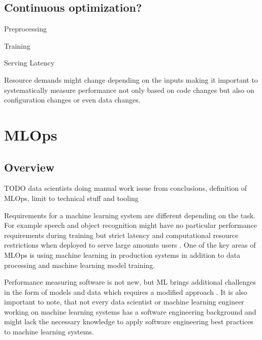 \subsection{Continuous optimization?}

Preprocessing

Training

Serving Latency

Resource demands might change depending on the inputs \parencite{brunnertPerformanceorientedDevOpsResearch2015} making it important to systematically measure performance not only based on code changes but also on configuration changes or even data changes.

\section{MLOps} %
\label{sec:mldevops}

\subsection{Overview}

TODO \parencite{kreuzbergerMachineLearningOperations2022} data scientists doing manual work issue from conclusions, definition of MLOps, limit to technical stuff and tooling

Requirements for a machine learning system are different depending on the task. For example speech and object recognition might have no particular performance requirements during training but strict latency and computational resource restrictions when deployed to serve large amounts users \parencite{hintonDistillingKnowledgeNeural2015}. One of the key areas of MLOps is using machine learning in production systems in addition to data processing and machine learning model training.

Performance measuring software is not new, but ML brings additional challenges in the form of models and data which requires a modified approach \parencite{breckMLTestScore2017a}. It is also important to note, that not every data scientist or machine learning engineer working on machine learning systems has a software engineering background \parencite{finzerDataScienceEducation2013} and might lack the necessary knowledge to apply software engineering best practices to machine learning systems.

